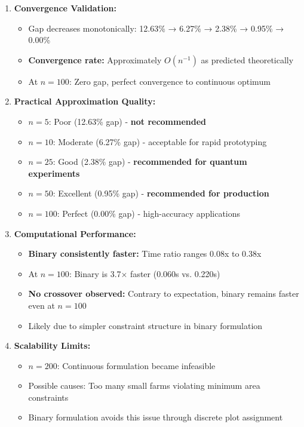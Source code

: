 \documentclass{article}
\begin{document}
\begin{enumerate}
    \item \textbf{Convergence Validation:}
    \begin{itemize}
        \item Gap decreases monotonically: 12.63\% → 6.27\% → 2.38\% → 0.95\% → 0.00\%
        \item \textbf{Convergence rate:} Approximately $O(n^{-1})$ as predicted theoretically
        \item At $n = 100$: Zero gap, perfect convergence to continuous optimum
    \end{itemize}
    
    \item \textbf{Practical Approximation Quality:}
    \begin{itemize}
        \item $n = 5$: Poor (12.63\% gap) - \textbf{not recommended}
        \item $n = 10$: Moderate (6.27\% gap) - acceptable for rapid prototyping
        \item $n = 25$: Good (2.38\% gap) - \textbf{recommended for quantum experiments}
        \item $n = 50$: Excellent (0.95\% gap) - \textbf{recommended for production}
        \item $n = 100$: Perfect (0.00\% gap) - high-accuracy applications
    \end{itemize}
    
    \item \textbf{Computational Performance:}
    \begin{itemize}
        \item \textbf{Binary consistently faster:} Time ratio ranges 0.08x to 0.38x
        \item At $n = 100$: Binary is 3.7$\times$ faster (0.060s vs. 0.220s)
        \item \textbf{No crossover observed:} Contrary to expectation, binary remains faster even at $n = 100$
        \item Likely due to simpler constraint structure in binary formulation
    \end{itemize}
    
    \item \textbf{Scalability Limits:}
    \begin{itemize}
        \item $n = 200$: Continuous formulation became infeasible
        \item Possible causes: Too many small farms violating minimum area constraints
        \item Binary formulation avoids this issue through discrete plot assignment
    \end{itemize}
\end{enumerate}
\end{document}
